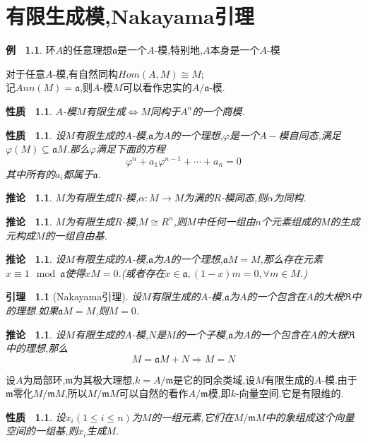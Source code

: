 \documentclass[b5paper,oneside]{ctexbook}
\newcommand{\mf}[1]{\mathfrak{#1}}
\theoremstyle{plain}
\newtheorem{lem}[thm]{引理~}
\newtheorem{prop}[thm]{性质~}
\newtheorem{cor}[thm]{推论~}
\theoremstyle{definition}
\newtheorem{exam}{例~}[chapter]
\begin{document}
\chapter{有限生成模,Nakayama引理}
\begin{exam} 
环$A$的任意理想$\mathfrak{a}$是一个$A$-模,特别地,$A$本身是一个$A$-模
\end{exam} 
对于任意$A$-模,有自然同构$Hom(A,M)\cong M;$\\
记$Ann(M)=\mathfrak{a}$,则$A$-模$M$可以看作忠实的$A/\mathfrak{a}$-模.
\begin{prop} 
$A$-模$M$有限生成$\Leftrightarrow M$同构于$A^n$的一个商模.
\end{prop}
\begin{prop} 
设$M$有限生成的$A$-模,$\mf{a}$为$A$的一个理想,$\varphi$是一个$A-$模自同态,满足$\varphi(M)\subseteq \mf{a}M$.那么$\varphi$满足下面的方程
\[\varphi^n+a_1\varphi^{n-1}+\cdots+a_n=0\]
其中所有的$a_i$都属于$\mf{a}$.
\end{prop}
\begin{cor}$M$为有限生成$R$-模,$\alpha:M\to M$为满的$R$-模同态,则$\alpha$为同构.
\end{cor}
\begin{cor}$M$为有限生成$R$-模,$M\cong R^n$,则$M$中任何一组由$n$个元素组成的$M$的生成元构成$M$的一组自由基.
\end{cor}
\begin{cor} 
设$M$有限生成的$A$-模,$\mf{a}$为$A$的一个理想,$\mf{a}M=M$,那么存在元素$x\equiv 1\mod{\mf{a}}$使得$xM=0$.(或者存在$x\in\mf{a},(1-x)m=0,\forall m\in M$.)
\end{cor} 
\begin{lem}[Nakayama引理]
设$M$有限生成的$A$-模,$\mf{a}$为$A$的一个包含在$A$的大根$\Re$中的理想.如果$\mf{a}M=M$,则$M=0$.
\end{lem}
\begin{cor} 
设$M$有限生成的$A$-模,$N$是$M$的一个子模,$\mf{a}$为$A$的一个包含在$A$的大根$\Re$中的理想,那么
\[M=\mf{a}M+N\Rightarrow M=N\]
\end{cor} 
设$A$为局部环,$\mf{m}$为其极大理想,$k=A/\mf{m}$是它的同余类域,设$M$有限生成的$A$-模.由于$\mf{m}$零化$M/\mf{m}M$,所以$M/\mf{m}M$可以自然的看作$A/\mf{m}$模,即$k$-向量空间.它是有限维的.
\begin{prop} 
设$x_i(1\leq i\leq n)$为$M$的一组元素,它们在$M/\mf{m}M$中的象组成这个向量空间的一组基,则$x_i$生成$M$.
\end{prop}
\end{document}
